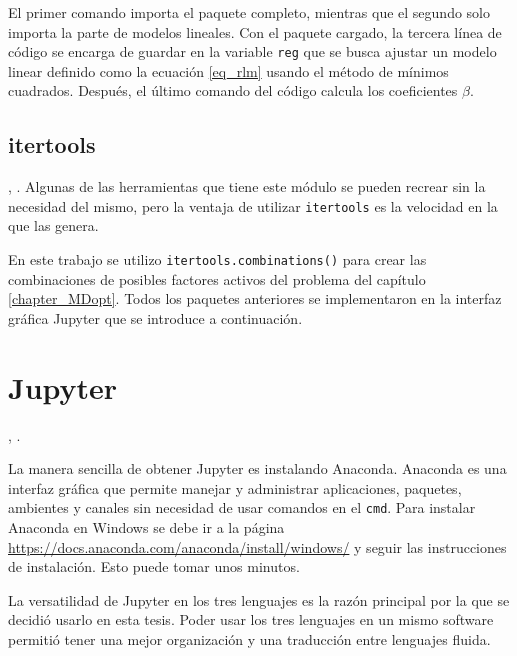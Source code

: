 El primer comando importa el paquete completo, mientras que el segundo solo importa la parte de modelos lineales. Con el paquete cargado, la tercera línea de código se encarga de guardar en la variable \texttt{reg} que se busca ajustar un modelo linear definido como la ecuación \ref{eq_rlm} usando el método de mínimos cuadrados. Después, el último comando del código calcula los coeficientes $\beta$. 

\subsection{itertools}
, \cite{doc_python}. Algunas de las herramientas que tiene este módulo se pueden recrear sin la necesidad del mismo, pero la ventaja de utilizar \texttt{itertools} es la velocidad en la que las genera. 

En este trabajo se utilizo \texttt{itertools.combinations()} para crear las combinaciones de posibles factores activos del problema del capítulo \ref{chapter_MDopt}. Todos los paquetes anteriores se implementaron en la interfaz gráfica \textsf{Jupyter} que se introduce a continuación.

\section{Jupyter} \label{cap_jupyter}
, \cite{jupyter_page}. 

La manera sencilla de obtener \textsf{Jupyter} es instalando \textsf{Anaconda}. \textsf{Anaconda} es una interfaz gráfica que permite manejar y administrar aplicaciones, paquetes, ambientes y canales sin necesidad de usar comandos en el \texttt{cmd}. Para instalar Anaconda en Windows se debe ir a la página \url{https://docs.anaconda.com/anaconda/install/windows/} y seguir las instrucciones de instalación. Esto puede tomar unos minutos. 

La versatilidad de \textsf{Jupyter} en los tres lenguajes es la razón principal por la que se decidió usarlo en esta tesis. Poder usar los tres lenguajes en un mismo software permitió tener una mejor organización y una traducción entre lenguajes fluida. 

